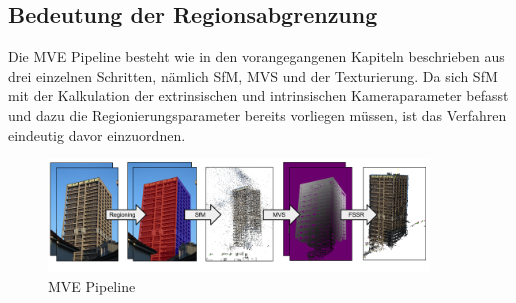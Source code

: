 \subsection{Bedeutung der Regionsabgrenzung}
Die MVE Pipeline besteht wie in den vorangegangenen Kapiteln beschrieben aus drei einzelnen Schritten, n\"amlich SfM, MVS und der Texturierung. Da sich SfM mit der Kalkulation der extrinsischen und intrinsischen Kameraparameter befasst und dazu die Regionierungsparameter bereits vorliegen m\"ussen, ist das Verfahren eindeutig davor einzuordnen. 

\begin{figure}[h]
\centering
\includegraphics[width=0.9\textwidth]{gfx/pipeline.png}
\caption[MVE Pipeline]{MVE Pipeline}
\label{gr:pipeline}
\end{figure}
\FloatBarrier